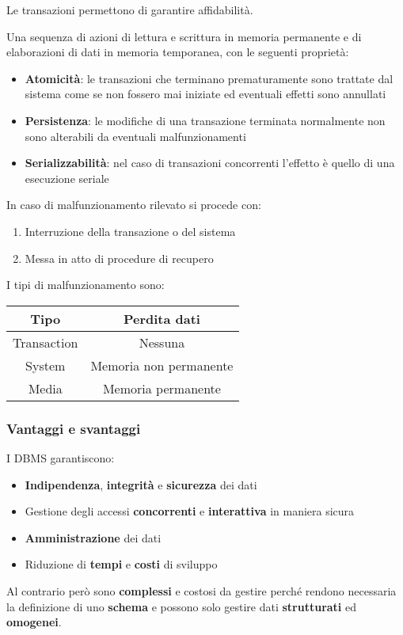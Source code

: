 Le transazioni permettono di garantire affidabilità.
\begin{definition}[Transazione]
	Una sequenza di azioni di lettura e scrittura in memoria permanente e di elaborazioni di dati in memoria temporanea, con	le seguenti proprietà:
	\begin{itemize}
		\item \textbf{Atomicità}: le transazioni che terminano prematuramente sono trattate dal sistema come se non fossero mai iniziate ed eventuali effetti sono annullati
		\item \textbf{Persistenza}: le modifiche di una transazione terminata normalmente non sono alterabili da eventuali	malfunzionamenti
		\item \textbf{Serializzabilità}: nel caso di transazioni concorrenti l’effetto è quello di una esecuzione seriale
	\end{itemize}
\end{definition}

In caso di malfunzionamento rilevato si procede con:
\begin{enumerate}
	\item Interruzione della transazione o del sistema
	\item Messa in atto di procedure di recupero
\end{enumerate}
I tipi di malfunzionamento sono:
\begin{center}
	\begin{tabular}{|c|c|}
		\hline
		\textbf{Tipo} & \textbf{Perdita dati} \\
		\hline
		Transaction & Nessuna \\
		\hline
		System & Memoria non permanente \\
		\hline
		Media & Memoria permanente \\
		\hline
	\end{tabular}
\end{center}

\subsubsection{Vantaggi e svantaggi}
I DBMS garantiscono:
\begin{itemize}
	\item \textbf{Indipendenza}, \textbf{integrità} e \textbf{sicurezza} dei dati
	\item Gestione degli accessi \textbf{concorrenti} e \textbf{interattiva} in maniera sicura
	\item \textbf{Amministrazione} dei dati
	\item Riduzione di \textbf{tempi} e \textbf{costi} di sviluppo
\end{itemize}
Al contrario però sono \textbf{complessi} e costosi da gestire perché rendono necessaria la definizione di uno \textbf{schema} e possono solo gestire dati \textbf{strutturati} ed \textbf{omogenei}.